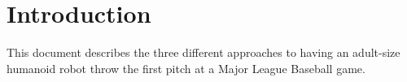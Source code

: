 \section{Introduction}
This document describes the three different approaches to having an adult-size humanoid robot throw the first pitch at a Major League Baseball game.

